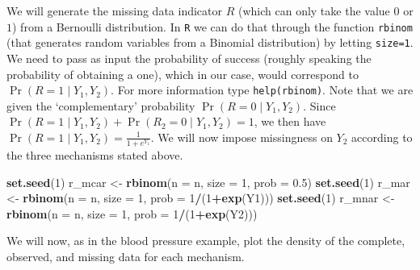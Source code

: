 \documentclass[
]{article}
\newenvironment{Shaded}{\begin{snugshade}}{\end{snugshade}}
\newcommand{\AttributeTok}[1]{\textcolor[rgb]{0.13,0.29,0.53}{#1}}
\newcommand{\DecValTok}[1]{\textcolor[rgb]{0.00,0.00,0.81}{#1}}
\newcommand{\FloatTok}[1]{\textcolor[rgb]{0.00,0.00,0.81}{#1}}
\newcommand{\FunctionTok}[1]{\textcolor[rgb]{0.13,0.29,0.53}{\textbf{#1}}}
\newcommand{\NormalTok}[1]{#1}
\newcommand{\OtherTok}[1]{\textcolor[rgb]{0.56,0.35,0.01}{#1}}
\newcommand{\SpecialCharTok}[1]{\textcolor[rgb]{0.81,0.36,0.00}{\textbf{#1}}}
\begin{document}
We will generate the missing data indicator \(R\) (which can only take
the value \(0\) or \(1\)) from a Bernoulli distribution. In \texttt{R}
we can do that through the function \texttt{rbinom} (that generates
random variables from a Binomial distribution) by letting
\texttt{size=1}. We need to pass as input the probability of success
(roughly speaking the probability of obtaining a one), which in our
case, would correspond to \(\Pr(R=1\mid Y_1, Y_2)\). For more
information type \texttt{help(rbinom)}. Note that we are given the
`complementary' probability \(\Pr(R=0\mid Y_1, Y_2)\). Since
\(\Pr(R=1\mid Y_1, Y_2) + \Pr(R_2=0\mid Y_1, Y_2) =1\), we then have
\(\Pr(R=1\mid Y_1, Y_2)=\frac{1}{1+e^{Y_1}}\). We will now impose
missingness on \(Y_2\) according to the three mechanisms stated above.

\begin{Shaded}
\begin{Highlighting}[]
\FunctionTok{set.seed}\NormalTok{(}\DecValTok{1}\NormalTok{)}
\NormalTok{r\_mcar }\OtherTok{\textless{}{-}} \FunctionTok{rbinom}\NormalTok{(}\AttributeTok{n =}\NormalTok{ n, }\AttributeTok{size =} \DecValTok{1}\NormalTok{, }\AttributeTok{prob =} \FloatTok{0.5}\NormalTok{)}
\FunctionTok{set.seed}\NormalTok{(}\DecValTok{1}\NormalTok{)}
\NormalTok{r\_mar }\OtherTok{\textless{}{-}} \FunctionTok{rbinom}\NormalTok{(}\AttributeTok{n =}\NormalTok{ n, }\AttributeTok{size =} \DecValTok{1}\NormalTok{, }\AttributeTok{prob =} \DecValTok{1}\SpecialCharTok{/}\NormalTok{(}\DecValTok{1}\SpecialCharTok{+}\FunctionTok{exp}\NormalTok{(Y1)))}
\FunctionTok{set.seed}\NormalTok{(}\DecValTok{1}\NormalTok{)}
\NormalTok{r\_mnar }\OtherTok{\textless{}{-}} \FunctionTok{rbinom}\NormalTok{(}\AttributeTok{n =}\NormalTok{ n, }\AttributeTok{size =} \DecValTok{1}\NormalTok{, }\AttributeTok{prob =} \DecValTok{1}\SpecialCharTok{/}\NormalTok{(}\DecValTok{1}\SpecialCharTok{+}\FunctionTok{exp}\NormalTok{(Y2)))}
\end{Highlighting}
\end{Shaded}

We will now, as in the blood pressure example, plot the density of the
complete, observed, and missing data for each mechanism.
\end{document}
